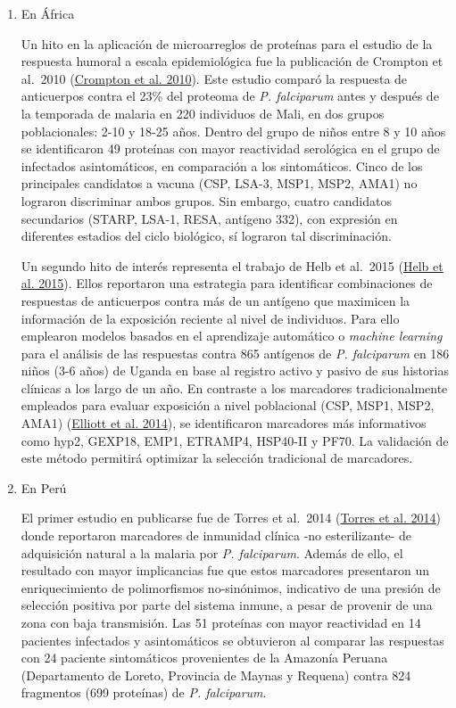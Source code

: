 \documentclass[
  a4paper]{article}
\begin{document}
\begin{enumerate}
\def\labelenumi{\alph{enumi}.}
\item
  En África

  Un hito en la aplicación de microarreglos de proteínas para el estudio
  de la respuesta humoral a escala epidemiológica fue la publicación de
  Crompton et al.~2010 (\protect\hyperlink{ref-crompton2010}{Crompton et
  al. 2010}). Este estudio comparó la respuesta de anticuerpos contra el
  23\% del proteoma de \emph{P. falciparum} antes y después de la
  temporada de malaria en 220 individuos de Mali, en dos grupos
  poblacionales: 2-10 y 18-25 años. Dentro del grupo de niños entre 8 y
  10 años se identificaron 49 proteínas con mayor reactividad serológica
  en el grupo de infectados asintomáticos, en comparación a los
  sintomáticos. Cinco de los principales candidatos a vacuna (CSP,
  LSA-3, MSP1, MSP2, AMA1) no lograron discriminar ambos grupos. Sin
  embargo, cuatro candidatos secundarios (STARP, LSA-1, RESA, antígeno
  332), con expresión en diferentes estadios del ciclo biológico, sí
  lograron tal discriminación.

  Un segundo hito de interés representa el trabajo de Helb et al.~2015
  (\protect\hyperlink{ref-Helb2015exposure}{Helb et al. 2015}). Ellos
  reportaron una estrategia para identificar combinaciones de respuestas
  de anticuerpos contra más de un antígeno que maximicen la información
  de la exposición reciente al nivel de individuos. Para ello emplearon
  modelos basados en el aprendizaje automático o \emph{machine learning}
  para el análisis de las respuestas contra 865 antígenos de \emph{P.
  falciparum} en 186 niños (3-6 años) de Uganda en base al registro
  activo y pasivo de sus historias clínicas a los largo de un año. En
  contraste a los marcadores tradicionalmente empleados para evaluar
  exposición a nivel poblacional (CSP, MSP1, MSP2, AMA1)
  (\protect\hyperlink{ref-elliott2014}{Elliott et al. 2014}), se
  identificaron marcadores más informativos como hyp2, GEXP18, EMP1,
  ETRAMP4, HSP40-II y PF70. La validación de este método permitirá
  optimizar la selección tradicional de marcadores.
\item
  En Perú

  El primer estudio en publicarse fue de Torres et al.~2014
  (\protect\hyperlink{ref-Torres2014asymptomatic}{Torres et al. 2014})
  donde reportaron marcadores de inmunidad clínica -no esterilizante- de
  adquisición natural a la malaria por \emph{P. falciparum}. Además de
  ello, el resultado con mayor implicancias fue que estos marcadores
  presentaron un enriquecimiento de polimorfismos no-sinónimos,
  indicativo de una presión de selección positiva por parte del sistema
  inmune, a pesar de provenir de una zona con baja transmisión. Las 51
  proteínas con mayor reactividad en 14 pacientes infectados y
  asintomáticos se obtuvieron al comparar las respuestas con 24 paciente
  sintomáticos provenientes de la Amazonía Peruana (Departamento de
  Loreto, Provincia de Maynas y Requena) contra 824 fragmentos (699
  proteínas) de \emph{P. falciparum}.


\end{enumerate}
\end{document}
